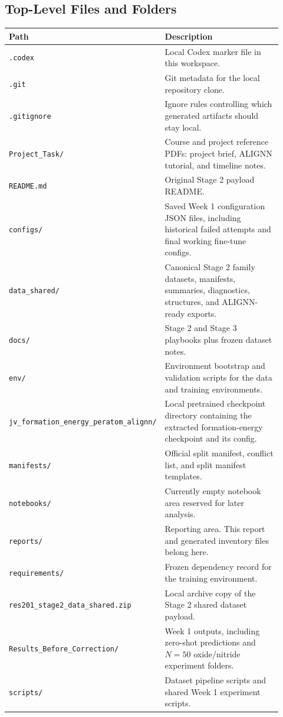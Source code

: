 \documentclass[11pt]{article}
\begin{document}
\subsection{Top-Level Files and Folders}
\begin{longtable}{p{0.28\linewidth}p{0.64\linewidth}}
\toprule
Path & Description \\
\midrule
\texttt{.codex} & Local Codex marker file in this workspace. \\
\texttt{.git} & Git metadata for the local repository clone. \\
\texttt{.gitignore} & Ignore rules controlling which generated artifacts should stay local. \\
\texttt{Project\_Task/} & Course and project reference PDFs: project brief, ALIGNN tutorial, and timeline notes. \\
\texttt{README.md} & Original Stage 2 payload README. \\
\texttt{configs/} & Saved Week 1 configuration JSON files, including historical failed attempts and final working fine-tune configs. \\
\texttt{data\_shared/} & Canonical Stage 2 family datasets, manifests, summaries, diagnostics, structures, and ALIGNN-ready exports. \\
\texttt{docs/} & Stage 2 and Stage 3 playbooks plus frozen dataset notes. \\
\texttt{env/} & Environment bootstrap and validation scripts for the data and training environments. \\
\texttt{jv\_formation\_energy\_peratom\_alignn/} & Local pretrained checkpoint directory containing the extracted formation-energy checkpoint and its config. \\
\texttt{manifests/} & Official split manifest, conflict list, and split manifest templates. \\
\texttt{notebooks/} & Currently empty notebook area reserved for later analysis. \\
\texttt{reports/} & Reporting area. This report and generated inventory files belong here. \\
\texttt{requirements/} & Frozen dependency record for the training environment. \\
\texttt{res201\_stage2\_data\_shared.zip} & Local archive copy of the Stage 2 shared dataset payload. \\
\texttt{Results_Before_Correction/} & Week 1 outputs, including zero-shot predictions and $N=50$ oxide/nitride experiment folders. \\
\texttt{scripts/} & Dataset pipeline scripts and shared Week 1 experiment scripts. \\
\bottomrule
\end{longtable}
\end{document}
